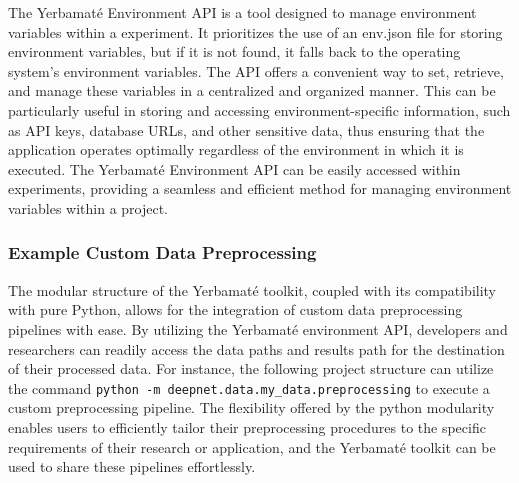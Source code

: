 The Yerbamaté Environment API is a tool designed to manage environment variables within a experiment. It prioritizes the use of an env.json file for storing environment variables, but if it is not found, it falls back to the operating system's environment variables. The API offers a convenient way to set, retrieve, and manage these variables in a centralized and organized manner. This can be particularly useful in storing and accessing environment-specific information, such as API keys, database URLs, and other sensitive data, thus ensuring that the application operates optimally regardless of the environment in which it is executed. The Yerbamaté Environment API can be easily accessed within experiments, providing a seamless and efficient method for managing environment variables within a project. 





\subsubsection{Example Custom Data Preprocessing}
The modular structure of the Yerbamaté toolkit, coupled with its compatibility with pure Python, allows for the integration of custom data preprocessing pipelines with ease. By utilizing the Yerbamaté environment API, developers and researchers can readily access the data paths and results path for the destination of their processed data. For instance, the following project structure can utilize the command \texttt{python -m deepnet.data.my\_data.preprocessing} to execute a custom preprocessing pipeline. The flexibility offered by the python modularity enables users to efficiently tailor their preprocessing procedures to the specific requirements of their research or application, and the Yerbamaté toolkit can be used to share these pipelines effortlessly.

